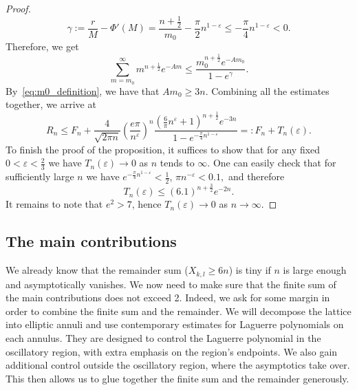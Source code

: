 \documentclass[11pt]{amsart}
\numberwithin{equation}{section}
\begin{document}
\begin{proof}
  \begin{equation}
      \gamma:=\frac{r}{M}- \Phi'(M) = \frac{n+\frac{1}{2}}{m_0} -\frac{\pi}{2}n^{1-\varepsilon} \leq -\frac{\pi}{4}n^{1-\varepsilon} < 0.
  \end{equation}
Therefore, we get
\begin{equation}
    \sum_{m=m_0}^{\infty} m^{n+\frac{1}{2}} e^{-A m} \leq \frac{m_0^{n+\frac{1}{2}} e^{-Am_0}}{1 - e^{\gamma}}. 
\end{equation}
By~\eqref{eq:m0_definition}, we have that $Am_0 \geq 3n$. Combining all the estimates together, we arrive at
    \begin{equation}
        R_n \leq F_n + \frac{4}{\sqrt{2 \pi n}} \left( \frac{e \pi}{n^\varepsilon} \right)^n \frac{\left( \frac{6}{\pi} n^\varepsilon + 1 \right)^{n+\frac{1}{2}} e^{-3n}}{1- e^{-\frac{ \pi}{4} n^{1-\varepsilon}}} =: F_n + T_n(\varepsilon).
    \end{equation}
    To finish the proof of the proposition, it suffices to show that for any fixed $0<\varepsilon < \frac{2}{3}$ we have $T_n(\varepsilon) \to 0$ as $n$ tends to $\infty.$ One can easily check that for sufficiently large $n$ we have $e^{-\frac{\pi}{4} n^{1-\varepsilon}}< \frac{1}{2}$, $\pi n^{-\varepsilon}<0.1,$ and therefore 
    \begin{equation}
        T_n(\varepsilon) \leq   (6.1)^{n+\frac{3}{2}} e^{-2n}.
    \end{equation}
    It remains to note that $e^{2}>7$, hence $T_n(\varepsilon) \to 0$ as $n \to \infty.$
\end{proof}

\subsection{The main contributions}
We already know that the remainder sum ($X_{k,l} \geq 6n$) is tiny if $n$ is large enough and asymptotically vanishes. We now need to make sure that the finite sum of the main contributions does not exceed 2. Indeed, we ask for some margin in order to combine the finite sum and the remainder. We will decompose the lattice into elliptic annuli and use contemporary estimates for Laguerre polynomials on each annulus. They are designed to control the Laguerre polynomial in the oscillatory region, with extra emphasis on the region's endpoints. We also gain additional control outside the oscillatory region, where the asymptotics take over. This then allows us to glue together the finite sum and the remainder generously.
\end{document}
